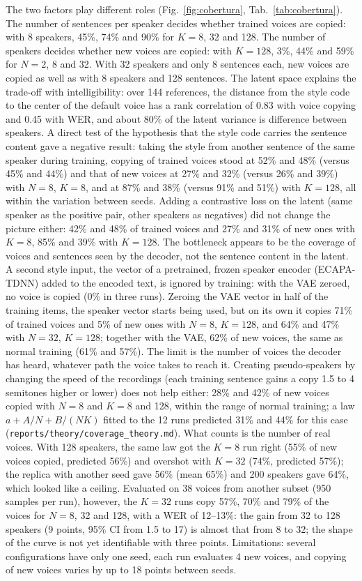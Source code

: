 \documentclass[twocolumn,a4paper,10pt]{article}
\begin{document}
The two factors play different roles (Fig.~\ref{fig:cobertura}, Tab.~\ref{tab:cobertura}). The number of sentences per speaker decides whether trained voices are copied: with 8 speakers, 45\%, 74\% and 90\% for $K=8$, 32 and 128. The number of speakers decides whether new voices are copied: with $K=128$, 3\%, 44\% and 59\% for $N=2$, 8 and 32. With 32 speakers and only 8 sentences each, new voices are copied as well as with 8 speakers and 128 sentences. The latent space explains the trade-off with intelligibility: over 144 references, the distance from the style code to the center of the default voice has a rank correlation of 0.83 with voice copying and 0.45 with WER, and about 80\% of the latent variance is difference between speakers. A direct test of the hypothesis that the style code carries the sentence content gave a negative result: taking the style from another sentence of the same speaker during training, copying of trained voices stood at 52\% and 48\% (versus 45\% and 44\%) and that of new voices at 27\% and 32\% (versus 26\% and 39\%) with $N=8$, $K=8$, and at 87\% and 38\% (versus 91\% and 51\%) with $K=128$, all within the variation between seeds. Adding a contrastive loss on the latent (same speaker as the positive pair, other speakers as negatives) did not change the picture either: 42\% and 48\% of trained voices and 27\% and 31\% of new ones with $K=8$, 85\% and 39\% with $K=128$. The bottleneck appears to be the coverage of voices and sentences seen by the decoder, not the sentence content in the latent. A second style input, the vector of a pretrained, frozen speaker encoder (ECAPA-TDNN) added to the encoded text, is ignored by training: with the VAE zeroed, no voice is copied (0\% in three runs). Zeroing the VAE vector in half of the training items, the speaker vector starts being used, but on its own it copies 71\% of trained voices and 5\% of new ones with $N=8$, $K=128$, and 64\% and 47\% with $N=32$, $K=128$; together with the VAE, 62\% of new voices, the same as normal training (61\% and 57\%). The limit is the number of voices the decoder has heard, whatever path the voice takes to reach it. Creating pseudo-speakers by changing the speed of the recordings (each training sentence gains a copy 1.5 to 4 semitones higher or lower) does not help either: 28\% and 42\% of new voices copied with $N=8$ and $K=8$ and 128, within the range of normal training; a law $a + A/N + B/(NK)$ fitted to the 12 runs predicted 31\% and 44\% for this case (\texttt{reports/theory/coverage\_theory.md}). What counts is the number of real voices. With 128 speakers, the same law got the $K=8$ run right (55\% of new voices copied, predicted 56\%) and overshot with $K=32$ (74\%, predicted 57\%); the replica with another seed gave 56\% (mean 65\%) and 200 speakers gave 64\%, which looked like a ceiling. Evaluated on 38 voices from another subset (950 samples per run), however, the $K=32$ runs copy 57\%, 70\% and 79\% of the voices for $N=8$, 32 and 128, with a WER of 12--13\%: the gain from 32 to 128 speakers (9 points, 95\% CI from 1.5 to 17) is almost that from 8 to 32; the shape of the curve is not yet identifiable with three points. Limitations: several configurations have only one seed, each run evaluates 4 new voices, and copying of new voices varies by up to 18 points between seeds.
\end{document}
